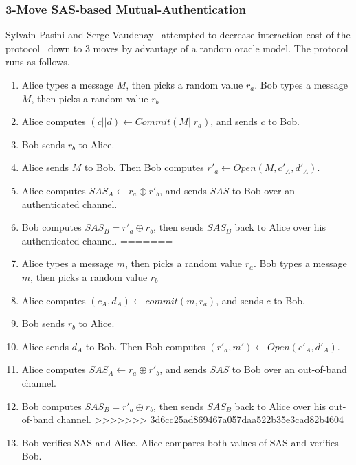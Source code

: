 \subsubsection*{3-Move SAS-based Mutual-Authentication}

Sylvain Pasini and Serge Vaudenay~\cite{Pasini:2006fu} attempted to decrease interaction cost of the protocol~\cite{Vaudenay:2005qa} down to 3 moves by advantage of a random oracle model. The protocol runs as follows. 

\begin{enumerate}
<<<<<<< HEAD
\item Alice types a message $M$, then picks a random value $r_a$. Bob types a message $M$, then picks a random value $r_b$
\item Alice computes $(c||d) \leftarrow Commit(M||r_a)$, and sends $c$ to Bob.
\item Bob sends $r_b$ to Alice.
\item Alice sends $M$ to Bob. Then Bob computes $r'_a \leftarrow Open(M,c'_A,d'_A)$. 
\item Alice computes $SAS_A \leftarrow r_a \oplus r'_b$, and sends $SAS$ to Bob over an authenticated channel. 
\item Bob computes $SAS_B = r'_a \oplus r_b$, then sends $SAS_B$ back to Alice over his authenticated channel. 
=======
\item Alice types a message $m$, then picks a random value $r_a$. Bob types a message $m$, then picks a random value $r_b$
\item Alice computes $(c_A,d_A) \leftarrow commit(m,r_a)$, and sends $c$ to Bob.
\item Bob sends $r_b$ to Alice.
\item Alice sends $d_A$ to Bob. Then Bob computes $(r'_a,m') \leftarrow Open(c'_A,d'_A)$. 
\item Alice computes $SAS_A \leftarrow r_a \oplus r'_b$, and sends $SAS$ to Bob over an out-of-band channel. 
\item Bob computes $SAS_B = r'_a \oplus r_b$, then sends $SAS_B$ back to Alice over his out-of-band channel. 
>>>>>>> 3d6cc25ad869467a057daa522b35e3cad82b4604
\item Bob verifies SAS and Alice. Alice compares both values of SAS and verifies Bob. 
\end{enumerate}

